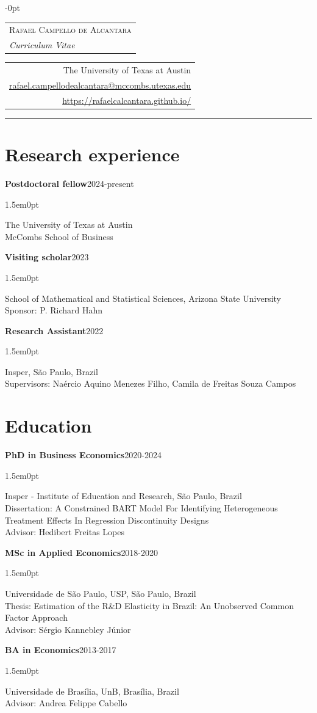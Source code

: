 \documentclass[11pt]{article}
\newlength{\cvlabelwidth}
\newcommand{\entry}[3]{%
  \textbf{#2}\hfill #1\par\nopagebreak
  \begin{adjustwidth}{1.5em}{0pt}\raggedright #3\end{adjustwidth}\vspace{7pt}}
\begin{document}
\begin{adjustwidth}{-\cvlabelwidth}{0pt}
\begin{tabular}[b]{@{}l@{}}
  {\fontsize{18}{22}\selectfont\scshape Rafael Campello de Alcantara}\\[2pt]
  {\itshape Curriculum Vitae}
\end{tabular}%
\hfill
{%
\begin{tabular}[b]{@{}r@{}}
  The University of Texas at Austin\\
  \href{mailto:rafael.campellodealcantara@mccombs.utexas.edu}{rafael.campellodealcantara@mccombs.utexas.edu}\\
  \url{https://rafaelcalcantara.github.io/}
\end{tabular}}

\vspace{6pt}
\noindent\rule{\linewidth}{0.5pt}
\end{adjustwidth}
\vspace{4pt}

\section{Research experience}
\label{sec:research.experience}
\entry{2024-present}{Postdoctoral fellow}{%
  The University of Texas at Austin\\
  McCombs School of Business}
\entry{2023}{Visiting scholar}{%
  School of Mathematical and Statistical Sciences, Arizona State University\\
  Sponsor: P. Richard Hahn}
\entry{2022}{Research Assistant}{%
  Insper, São Paulo, Brazil\\
  Supervisors: Naércio Aquino Menezes Filho, Camila de Freitas Souza Campos}

\section{Education}
\label{sec:org7da8f15}
\entry{2020-2024}{PhD in Business Economics}{%
  Insper - Institute of Education and Research, São Paulo, Brazil\\
  Dissertation: A Constrained BART Model For Identifying Heterogeneous Treatment Effects In Regression Discontinuity Designs\\
  Advisor: Hedibert Freitas Lopes}
\entry{2018-2020}{MSc in Applied Economics}{%
  Universidade de São Paulo, USP, São Paulo, Brazil\\
  Thesis: Estimation of the R\&D Elasticity in Brazil: An Unobserved Common Factor Approach\\
  Advisor: Sérgio Kannebley Júnior}
\entry{2013-2017}{BA in Economics}{%
  Universidade de Brasília, UnB, Brasília, Brazil\\
  Advisor: Andrea Felippe Cabello}
\end{document}
